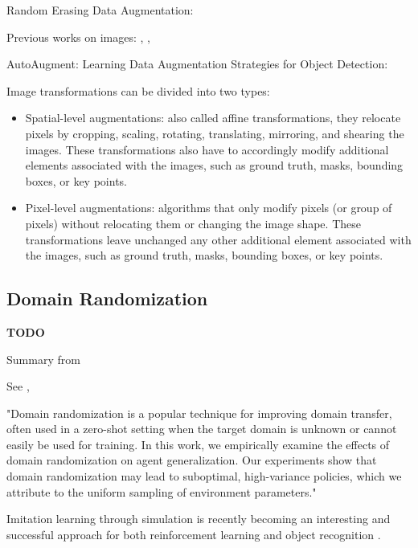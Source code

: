 Random Erasing Data Augmentation: \cite{zhong2017random}

Previous works on images:  \cite{yue2019domain}, \cite{Takahashi_2020}, \cite{xie2020unsupervised}

AutoAugment: \cite{cubuk2019autoaugment}
Learning Data Augmentation Strategies for Object Detection: \cite{zoph2019learning}

\medskip

Image transformations can be divided into two types:
\begin{itemize}
	\item Spatial-level augmentations: also called affine transformations, they relocate pixels by cropping, scaling, rotating, translating, mirroring, and shearing the images. These transformations also have to accordingly modify additional elements associated with the images, such as ground truth, masks, bounding boxes, or key points.
	\item Pixel-level augmentations: algorithms that only modify pixels (or group of pixels) without relocating them or changing the image shape. These transformations leave unchanged any other additional element associated with the images, such as ground truth, masks, bounding boxes, or key points.
\end{itemize}


\subsection{Domain Randomization}
\label{subsec:domain-randomization}

\textbf{TODO}

Summary from \cite{mehta2019active}

See \cite{weng2019DR_explanation}, \cite{tobin2017domain}
 
"Domain randomization is a popular technique for improving domain transfer, often used in a zero-shot setting when the target domain is unknown or cannot easily be used for training. In this work, we empirically examine the effects of domain randomization on agent generalization. Our experiments show that domain randomization may lead to suboptimal, high-variance policies, which we attribute to the uniform sampling of environment parameters."

\medskip

Imitation learning through simulation is recently becoming an interesting and successful approach for both reinforcement learning \cite{imitation_learning_3d_navigation} and object recognition \cite{tobin2017domain} \cite{weng2019DR}.

